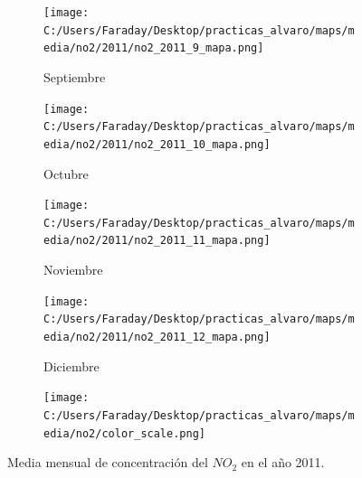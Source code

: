 \documentclass[12pt]{beamer}
\begin{document}
\begin{frame}[squeeze]
\begin{figure}[H]
\begin{subfigure}[H]{0.20\textwidth}
\texttt{[image: C:/Users/Faraday/Desktop/practicas\_alvaro/maps/media/no2/2011/no2\_2011\_9\_mapa.png]}
\captionsetup{labelformat=empty}
\caption{\scriptsize Septiembre}
\label{fig:map-no2-2011-9}
\end{subfigure}
%
\begin{subfigure}[H]{0.20\textwidth}
\texttt{[image: C:/Users/Faraday/Desktop/practicas\_alvaro/maps/media/no2/2011/no2\_2011\_10\_mapa.png]}
\captionsetup{labelformat=empty}
\caption{\scriptsize Octubre}
\label{fig:map-no2-2011-10}
\end{subfigure}
%
\begin{subfigure}[H]{0.20\textwidth}
\texttt{[image: C:/Users/Faraday/Desktop/practicas\_alvaro/maps/media/no2/2011/no2\_2011\_11\_mapa.png]}
\captionsetup{labelformat=empty}
\caption{\scriptsize Noviembre}
\label{fig:map-no2-2011-11}
\end{subfigure}
%
\begin{subfigure}[H]{0.20\textwidth}
\texttt{[image: C:/Users/Faraday/Desktop/practicas\_alvaro/maps/media/no2/2011/no2\_2011\_12\_mapa.png]}
\captionsetup{labelformat=empty}
\caption{\scriptsize Diciembre}
\label{fig:map-no2-2011-12}
\end{subfigure}

\begin{subfigure}[H]{0.45\textwidth}
\texttt{[image: C:/Users/Faraday/Desktop/practicas\_alvaro/maps/media/no2/color\_scale.png]}
\captionsetup{labelformat=empty}
\caption{}
\end{subfigure}

\vspace*{-7mm}
\caption{\scriptsize Media mensual de concentración del $NO_{2}$ en el año 2011.}
\label{fig:map-no2-2011}
\end{figure}
\end{frame}
\end{document}
